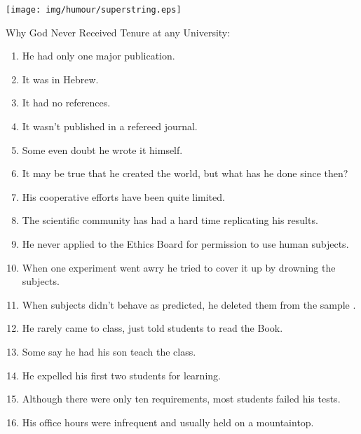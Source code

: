 	\begin{center}
	\texttt{[image: img/humour/superstring.eps]}
	\end{center}
\begin{center}\underline{\hspace{5 cm}}\end{center}
	
Why God Never Received Tenure at any University:
\begin{enumerate}
	\item He had only one major publication.

	\item It was in Hebrew. 

	\item It had no references. 

	\item It wasn't published in a refereed journal.

	\item Some even doubt he wrote it himself. 

	\item It may be true that he created the world, but what has he done since then? 

	\item His cooperative efforts have been quite limited. 

	\item The scientific community has had a hard time replicating his results. 

	\item He never applied to the Ethics Board for permission to use human subjects.

	\item When one experiment went awry he tried to cover it up by drowning the subjects. 

	\item When subjects didn't behave as predicted, he deleted them from the sample . 

	\item He rarely came to class, just told students to read the Book. 

	\item Some say he had his son teach the class. 

	\item He expelled his first two students for learning. 

	\item Although there were only ten requirements, most students failed his tests. 

	\item His office hours were infrequent and usually held on a mountaintop.
\end{enumerate}

